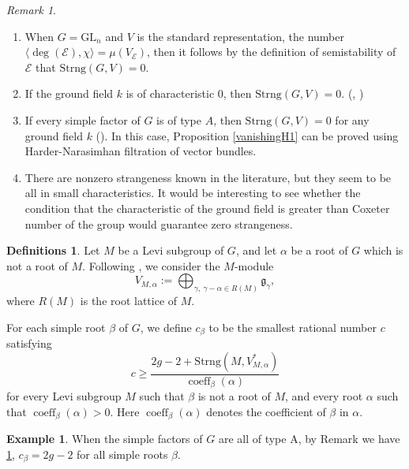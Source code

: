 \documentclass[11pt]{amsart}
\theoremstyle{definition}
\newtheorem{defns}[thm]{Definitions}
\newtheorem{exmp}[thm]{Example}
\theoremstyle{remark}
\newtheorem{rem}[thm]{Remark}
\newcommand{\str}{\mathrm{Strng}}
\newcommand{\GL}{\mathrm{GL}}
\numberwithin{equation}{section}
\begin{document}
\begin{rem} \label{strangeness remark}

\begin{enumerate}
\item  When $G=\GL_n$ and $V$ is the standard representation, the number $\langle \deg(\mathcal{E}),\chi \rangle = \mu(V_{\mathcal{E}})$, then it follows by the definition of semistability of $\mathcal{E}$ that $\str(G,V)=0$. 
    \item If the ground field $k$ is of characteristic $0$, then $\str(G,V)=0$. (\cite[10.4.3]{DG2}, \cite{RR})
    \item If every simple factor of $G$ is of type $A$, then $\str(G,V)=0$ for any ground field $k$ (\cite[Corollary 10.5.2]{DG2}). In this case, Proposition \ref{vanishingH1} can be proved using Harder-Narasimhan filtration of vector bundles.
    \item There are nonzero strangeness known in the literature, but they seem to be all in small characteristics. It would be interesting to see whether the condition that the characteristic of the ground field is greater than Coxeter number of the group would guarantee zero strangeness. 
    
\end{enumerate}
    
\end{rem}



\begin{defns}
Let $M$ be a Levi subgroup of $G$, and let $\alpha$ be a root of $G$ which is not a root of $M$. Following \cite{DG2}, we consider the $M$-module
$$
V_{M,\alpha}:=\bigoplus_{\gamma,\ \gamma-\alpha\in R(M)}\mathfrak{g}_\gamma,
$$
where $R(M)$ is the root lattice of $M$.

For each simple root $\beta$ of $G$, we define $c_\beta$ to be the smallest rational number $c$ satisfying
$$
c\geq
\frac{2g-2+\str(M,V_{M,\alpha}^*)}
{\operatorname{coeff}_\beta(\alpha)}
$$
for every Levi subgroup $M$ such that $\beta$ is not a root of $M$, and every root $\alpha$ such that $\operatorname{coeff}_\beta(\alpha)>0$. Here $\operatorname{coeff}_\beta(\alpha)$ denotes the coefficient of $\beta$ in $\alpha$.
\end{defns}


\begin{exmp}
    When the simple factors of $G$ are all of type A, by Remark we have \ref{strangeness remark}, $c_\beta=2g-2$ for all simple roots $\beta$.
\end{exmp}
\end{document}
